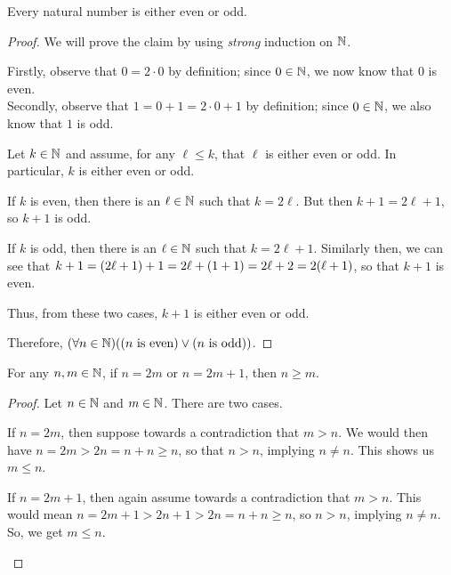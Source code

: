 \begin{example}
    Every natural number is either even or odd.
\end{example}
\begin{proof}
    We will prove the claim by using \emph{strong} induction on $\mathbb{N}$.
    \begin{case}
        Firstly, observe that $0 = 2 \cdot 0$ by definition;
        since $0 \in \mathbb{N}$, we now know that $0$ is even.\\
        Secondly, observe that $1 = 0 + 1 = 2 \cdot 0 + 1$ by definition;
        since $0 \in \mathbb{N}$, we also know that $1$ is odd.
    \end{case}
    \begin{case}
        Let $k \in \mathbb{N}$ and assume, for any $\ell \leq k$, that $\ell$ is either even or odd.
        In particular, $k$ is either even or odd.
        \begin{case}[Case 1]
            If $k$ is even, then there is an $\ell \in \mathbb{N}$ such that $k = 2\ell$.
            But then $k + 1 = 2\ell + 1$, so $k + 1$ is odd.
        \end{case}
        \begin{case}[Case 2]
            If $k$ is odd, then there is an $\ell \in \mathbb{N}$ such that $k = 2\ell + 1$.
            Similarly then,
            we can see that $k + 1 = \pn*{2\ell + 1} + 1 = 2\ell + \pn*{1 + 1} = 2\ell + 2 = 2\pn*{\ell + 1}$,
            so that $k + 1$ is even.
        \end{case}
        Thus, from these two cases, $k + 1$ is either even or odd.
    \end{case}
    Therefore, $\pn*{\forall n \in \N}\pn*{\pn*{n \text{ is even}} \join \pn*{n \text{ is odd}}}$.
\end{proof}

\begin{lemma}
    For any $n, m \in \mathbb{N}$, if $n = 2m$ or $n = 2m + 1$, then $n \geq m$.
\end{lemma}
\begin{proof}
    Let $n \in \mathbb{N}$ and $m \in \mathbb{N}$.
    There are two cases.
    \begin{case}[Case 1]
        If $n = 2m$, then
        suppose towards a contradiction that $m > n$.
        We would then have $n = 2m > 2n = n + n \geq n$,
        so that $n > n$, implying $n \neq n$. \contradiction
        This shows us $m \leq n$.
    \end{case}
    \begin{case}[Case 2]
        If $n = 2m + 1$, then
        again assume towards a contradiction that $m > n$.
        This would mean $n = 2m + 1 > 2n + 1 > 2n = n + n \geq n$,
        so $n > n$, implying $n \neq n$. \contradiction
        So, we get $m \leq n$.
    \end{case}
\end{proof}

